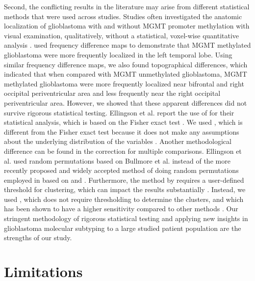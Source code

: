 Second, the conflicting results in the literature may arise from different statistical methods that were used across studies.
Studies often investigated the anatomic localization of glioblastoma with and without \gls{MGMT} promoter methylation with visual examination, qualitatively, without a statistical, voxel-wise quantitative analysis \autocite{carillo2012relationship,eoli2007methylation,han2018structural,drabycz2010analysis}.
 used frequency difference maps to demonstrate that \gls{MGMT} methylated glioblastoma were more frequently localized in the left temporal lobe.
Using similar frequency difference maps, we also found topographical differences, which indicated that when compared with \gls{MGMT} unmethylated glioblastoma, \gls{MGMT} methylated glioblastoma were more frequently localized near bifrontal and right occipital periventricular area and less frequently near the right occipital periventricular area.
However, we showed that these apparent differences did not survive rigorous statistical testing.
Ellingson et al. report the use of  for their statistical analysis, which is based on the Fisher exact test \autocite{ellingson2012anatomic}.
We used , which is different from the Fisher exact test because it does not make any assumptions about the underlying distribution of the variables \autocite{winkler2014permutation}.
Another methodological difference can be found in the correction for multiple comparisons.
Ellingson et al. used random permutations based on Bullmore et al. instead of the more recently proposed and widely accepted method of doing random permutations employed in  based on  and .
Furthermore, the method by  requires a user-defined threshold for clustering, which can impact the results substantially \autocite{bullmore1999global}.
Instead, we used , which does not require thresholding to determine the clusters, and which has been shown to have a higher sensitivity compared to other methods \autocite{smith2009threshold}.
Our stringent methodology of rigorous statistical testing and applying new insights in glioblastoma molecular subtyping to a large studied patient population are the strengths of our study.

\section{Limitations}

